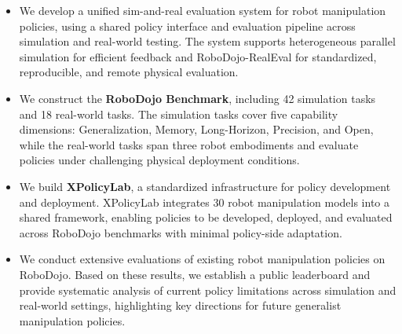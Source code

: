 \begin{itemize}
\item We develop a unified sim-and-real evaluation system for robot manipulation policies, using a shared policy interface and evaluation pipeline across simulation and real-world testing. The system supports heterogeneous parallel simulation for efficient feedback and RoboDojo-RealEval for standardized, reproducible, and remote physical evaluation.

\item We construct the \textbf{RoboDojo Benchmark}, including 42 simulation tasks and 18 real-world tasks. The simulation tasks cover five capability dimensions: Generalization, Memory, Long-Horizon, Precision, and Open, while the real-world tasks span three robot embodiments and evaluate policies under challenging physical deployment conditions.

\item We build \textbf{XPolicyLab}, a standardized infrastructure for policy development and deployment. XPolicyLab integrates 30 robot manipulation models into a shared framework, enabling policies to be developed, deployed, and evaluated across RoboDojo benchmarks with minimal policy-side adaptation.

\item We conduct extensive evaluations of existing robot manipulation policies on RoboDojo. Based on these results, we establish a public leaderboard and provide systematic analysis of current policy limitations across simulation and real-world settings, highlighting key directions for future generalist manipulation policies.

\end{itemize}



